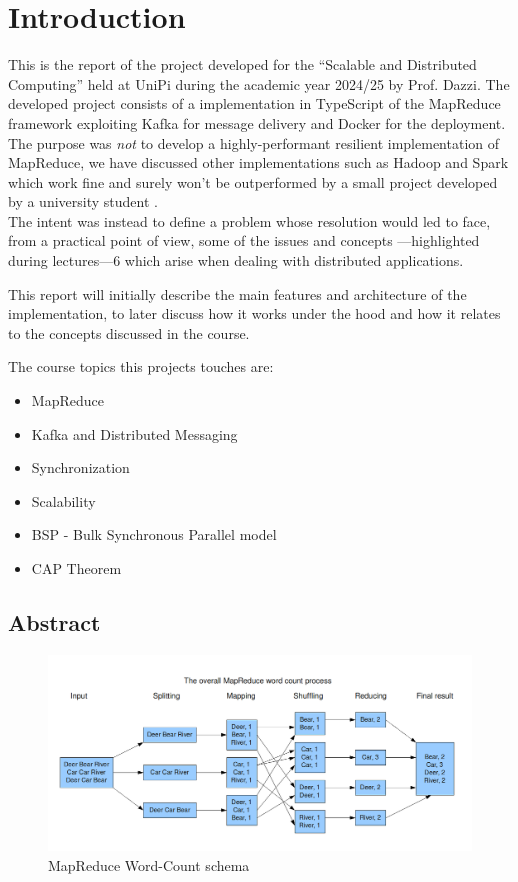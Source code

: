 \chapter{Introduction}
\lstset{language=javascript}


This is the report of the project developed for the ``Scalable and Distributed Computing'' held at UniPi during the academic year 2024/25 by Prof. Dazzi.
The developed project consists of a implementation in TypeScript of the MapReduce framework exploiting Kafka for message delivery and Docker for the deployment.
The purpose was \textit{not} to develop a highly-performant resilient implementation of MapReduce, we have discussed other implementations such as Hadoop and Spark which work fine and surely won't be outperformed by a small project developed by a university student \smiley. \\
The intent was instead to define a problem whose resolution would led to face, from a practical point of view, some of the issues and concepts ---highlighted during lectures---6 which arise when dealing with distributed applications.

This report will initially describe the main features and architecture of the implementation, to later discuss how it works under the hood and how it relates to the concepts discussed in the course.

\nl

{The course topics this projects touches are:\ns
\begin{itemize}
   \item MapReduce
   \item Kafka and Distributed Messaging
   \item Synchronization
   \item Scalability
   \item BSP - Bulk Synchronous Parallel model
   \item CAP Theorem
\end{itemize}}
\newpage

\section{Abstract}
\begin{figure}[htbp]
   \centering
   \includegraphics[width=\columnwidth]{images/mapreduce.png}
   \caption{MapReduce Word-Count schema}
   \label{fig:mapreduce}
\end{figure}

